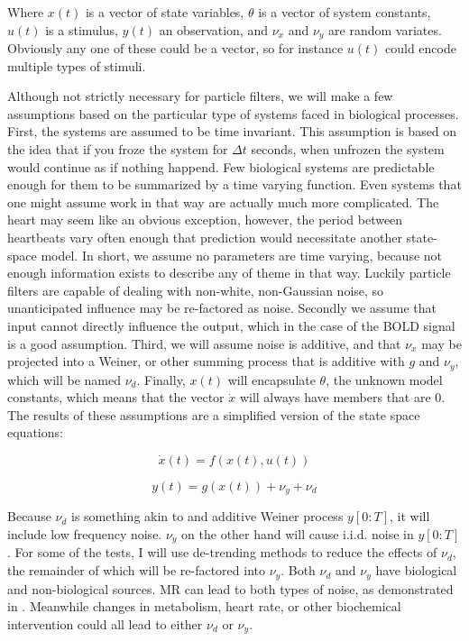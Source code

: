 \documentclass{article}
\begin{document}
Where $x(t)$ is a vector of state variables, $\theta$ is a vector of system
constants, $u(t)$ is a stimulus, $y(t)$ an observation, and
$\nu_x$ and $\nu_y$ are random variates. Obviously any one of these could
be a vector, so for instance $u(t)$ could encode multiple types of stimuli.

Although not strictly necessary for particle filters, we will make a few
assumptions based on the particular type of systems faced in biological 
processes. First, the systems are assumed to be time invariant. This 
assumption is based on the idea that if you froze the system for $\Delta t$
seconds, when unfrozen the system would continue as if nothing happend. 
Few biological systems are predictable enough for them to be summarized
by a time varying function. Even systems that one might assume work in that
way are actually much more complicated. The heart may seem like an obvious
exception, however, the period between heartbeats vary often enough that prediction
would necessitate another state-space model. In short, we
assume no parameters are time varying, because not enough information exists to
describe any of theme in that way. Luckily particle filters are capable 
of dealing with non-white, non-Gaussian noise, so unanticipated influence
may be re-factored as noise. Secondly we assume that input cannot directly
influence the output, which in the case of the BOLD signal is a good assumption.
Third, we will assume noise is additive, and that $\nu_x$ may be projected into
a Weiner, or other summing process that is additive with $g$ and $\nu_y$, which
will be named $\nu_d$.
Finally, $x(t)$ will encapsulate $\theta$, the unknown model constants, which
means that the vector $\dot{x}$ will always have members
that are 0. The results of these assumptions are a simplified version of the
state space equations:

\begin{equation}
\label{stateass}
\dot{x}(t) = f(x(t), u(t))
\end{equation}

\begin{equation}
\label{measass}
y(t) = g(x(t)) + \nu_y + \nu_d
\end{equation}

Because $\nu_d$ is something akin to and additive Weiner process $y[0:T]$, it 
will include low frequency noise. $\nu_y$ on the other hand will cause i.i.d. noise
in $y[0:T]$. For some of the tests, I will use de-trending methods to reduce the effects of 
$\nu_d$, the remainder of which will be re-factored into $\nu_y$. Both $\nu_d$ and $\nu_y$
have biological and non-biological sources. MR can lead to both types of noise, 
as demonstrated in \cite{drift}. Meanwhile changes in metabolism, heart rate, or
other biochemical intervention could all lead to either $\nu_d$ or $\nu_y$.
\end{document}

